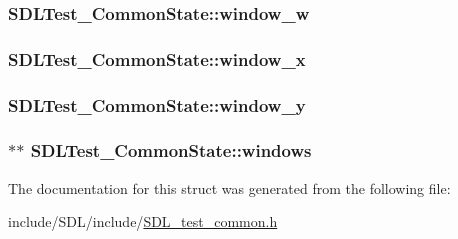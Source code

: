 \hypertarget{struct_s_d_l_test___common_state_adc94ae1febd2aa3fa4b190cd0f8cb546}{
\subsubsection[{window\-\_\-w}]{ S\-D\-L\-Test\-\_\-\-Common\-State\-::window\-\_\-w}}\label{struct_s_d_l_test___common_state_adc94ae1febd2aa3fa4b190cd0f8cb546}
\hypertarget{struct_s_d_l_test___common_state_a5413ab562164642b3e6ee97ab5d938bf}{
\subsubsection[{window\-\_\-x}]{ S\-D\-L\-Test\-\_\-\-Common\-State\-::window\-\_\-x}}\label{struct_s_d_l_test___common_state_a5413ab562164642b3e6ee97ab5d938bf}
\hypertarget{struct_s_d_l_test___common_state_a1fcd61cbe37c2bb563e7b2f1c6853d29}{
\subsubsection[{window\-\_\-y}]{ S\-D\-L\-Test\-\_\-\-Common\-State\-::window\-\_\-y}}\label{struct_s_d_l_test___common_state_a1fcd61cbe37c2bb563e7b2f1c6853d29}
\hypertarget{struct_s_d_l_test___common_state_a0a054f0c45eb9d21f9561d701e721106}{
\subsubsection[{windows}]{$\ast$$\ast$ S\-D\-L\-Test\-\_\-\-Common\-State\-::windows}}\label{struct_s_d_l_test___common_state_a0a054f0c45eb9d21f9561d701e721106}


The documentation for this struct was generated from the following file\-:\begin{DoxyCompactItemize}
\item 
include/\-S\-D\-L/include/\hyperlink{_s_d_l__test__common_8h}{S\-D\-L\-\_\-test\-\_\-common.\-h}\end{DoxyCompactItemize}

